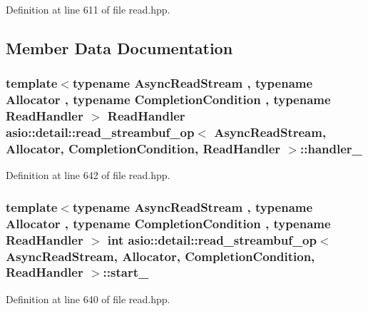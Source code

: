 Definition at line 611 of file read.\+hpp.



\subsection{Member Data Documentation}
\hypertarget{classasio_1_1detail_1_1read__streambuf__op_a13df8eb74bfc425dbe35bf9b5b3ee34c}{}
\subsubsection[{handler\+\_\+}]{\setlength{\rightskip}{0pt plus 5cm}template$<$typename Async\+Read\+Stream , typename Allocator , typename Completion\+Condition , typename Read\+Handler $>$ Read\+Handler {\bf asio\+::detail\+::read\+\_\+streambuf\+\_\+op}$<$ Async\+Read\+Stream, Allocator, Completion\+Condition, Read\+Handler $>$\+::handler\+\_\+}\label{classasio_1_1detail_1_1read__streambuf__op_a13df8eb74bfc425dbe35bf9b5b3ee34c}


Definition at line 642 of file read.\+hpp.

\hypertarget{classasio_1_1detail_1_1read__streambuf__op_ad2fce322315f6b21047377f675e22cc7}{}
\subsubsection[{start\+\_\+}]{\setlength{\rightskip}{0pt plus 5cm}template$<$typename Async\+Read\+Stream , typename Allocator , typename Completion\+Condition , typename Read\+Handler $>$ int {\bf asio\+::detail\+::read\+\_\+streambuf\+\_\+op}$<$ Async\+Read\+Stream, Allocator, Completion\+Condition, Read\+Handler $>$\+::start\+\_\+}\label{classasio_1_1detail_1_1read__streambuf__op_ad2fce322315f6b21047377f675e22cc7}


Definition at line 640 of file read.\+hpp.

\hypertarget{classasio_1_1detail_1_1read__streambuf__op_ae6b7af6cf5d34d6d6ad76b3840a3d786}{}
